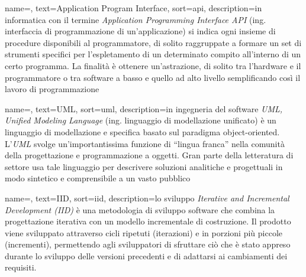 






 {
    name=,
    text=Application Program Interface,
    sort=api,
    description={in informatica con il termine \emph{Application Programming Interface API} (ing. interfaccia di programmazione di un'applicazione) si indica ogni insieme di procedure disponibili al programmatore, di solito raggruppate a formare un set di strumenti specifici per l'espletamento di un determinato compito all'interno di un certo programma. La finalità è ottenere un'astrazione, di solito tra l'hardware e il programmatore o tra software a basso e quello ad alto livello semplificando così il lavoro di programmazione}
}

 {
    name=,
    text=UML,
    sort=uml,
    description={in ingegneria del software \emph{UML, Unified Modeling Language} (ing. linguaggio di modellazione unificato) è un linguaggio di modellazione e specifica basato sul paradigma object-oriented. L'\emph{UML} svolge un'importantissima funzione di ``lingua franca'' nella comunità della progettazione e programmazione a oggetti. Gran parte della letteratura di settore usa tale linguaggio per descrivere soluzioni analitiche e progettuali in modo sintetico e comprensibile a un vasto pubblico}
}

 {
    name=,
    text=IID,
    sort=iid,
    description={lo sviluppo \emph{Iterative and Incremental Development (IID)} è una metodologia di sviluppo software che combina la progettazione iterativa con un modello incrementale di costruzione. Il prodotto viene sviluppato attraverso cicli ripetuti (iterazioni) e in porzioni più piccole (incrementi), permettendo agli sviluppatori di sfruttare ciò che è stato appreso durante lo sviluppo delle versioni precedenti e di adattarsi ai cambiamenti dei requisiti.}
}

